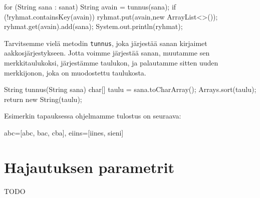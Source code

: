 \begin{code}
for (String sana : sanat) {
    String avain = tunnus(sana);
    if (!ryhmat.containsKey(avain)) {
        ryhmat.put(avain,new ArrayList<>());
    }
    ryhmat.get(avain).add(sana);
}
System.out.println(ryhmat);
\end{code}

Tarvitsemme vielä metodin \texttt{tunnus}, joka järjestää
sanan kirjaimet aakkosjärjestykseen.
Jotta voimme järjestää sanan, muutamme sen merkkitaulukoksi,
järjestämme taulukon, ja palautamme sitten uuden merkkijonon,
joka on muodostettu taulukosta.

\begin{code}
String tunnus(String sana) {
    char[] taulu = sana.toCharArray();
    Arrays.sort(taulu);
    return new String(taulu);
}
\end{code}

Esimerkin tapauksessa ohjelmamme tulostus on seuraava:

\begin{code}
{abc=[abc, bac, cba], eiins=[iines, sieni]}
\end{code}

\section{Hajautuksen parametrit}

TODO